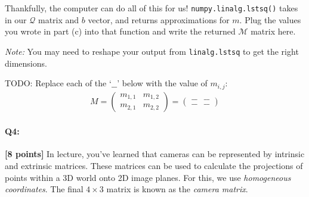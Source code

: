 \begin{enumerate}[(a)]
Thankfully, the computer can do all of this for us! \texttt{numpy.linalg.lstsq()} takes in our $\mathcal{Q}$ matrix and $b$ vector, and returns approximations for $m$. Plug the values you wrote in part (c) into that function and write the returned $\mathcal{M}$ matrix here.

\textit{Note:} You may need to reshape your output from \texttt{linalg.lstsq} to get the right dimensions.

\begin{mdframed}
TODO: Replace each of the `$\_\_$' below with the value of $m_{i, j}$:
\begin{align*}
    M = \begin{pmatrix} m_{1,1} & m_{1,2} \\ m_{2,1} & m_{2,2} \end{pmatrix} = \begin{pmatrix} \_\_ & \_\_ \\ \_\_ & \_\_ \end{pmatrix}
\end{align*}
\end{mdframed}

\end{enumerate}





\pagebreak
\paragraph{Q4:} \textbf{[8 points]}
In lecture, you've learned that cameras can be represented by intrinsic and extrinsic matrices. These matrices can be used to calculate the projections of points within a 3D world onto 2D image planes. For this, we use \emph{homogeneous coordinates}. The final $4\times3$ matrix is known as the \emph{camera matrix}.

